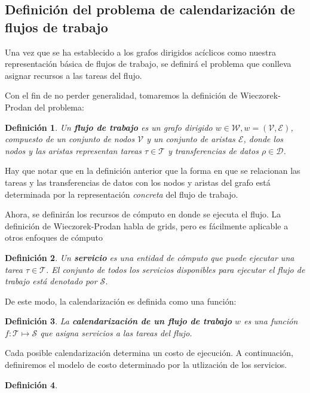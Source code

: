 \documentclass[letterpaper, 12pt]{report}
\newtheorem{defn}{Definición}
\begin{document}
\subsection{Definición del problema de calendarización de flujos de trabajo}
Una vez que se ha establecido a los grafos dirigidos acíclicos como nuestra representación básica de flujos de trabajo, se definirá el problema que conlleva asignar recursos a las tareas del flujo.

Con el fin de no perder generalidad, tomaremos la definición de Wieczorek-Prodan \cite{wieczorek2008taxonomies} del problema:

\begin{defn}
Un \textbf{flujo de trabajo} es un grafo dirigido $w \in \mathcal{W}, w = (\mathcal{V},\mathcal{E})$, compuesto de un conjunto de nodos $\mathcal{V}$ y un conjunto de aristas $\mathcal{E}$, donde los nodos y las aristas representan tareas $ \tau \in \mathcal{T}$ y transferencias de datos $ \rho \in \mathcal{D}$.
\end{defn}

Hay que notar que en la definición anterior que la forma en que se relacionan las tareas y las transferencias de datos con los nodos y aristas del grafo está determinada por la representación \emph{concreta} del flujo de trabajo.

Ahora, se definirán los recursos de cómputo en donde se ejecuta el flujo. La definición de Wieczorek-Prodan habla de grids, pero es fácilmente aplicable a otros enfoques de cómputo

\begin{defn}
Un \textbf{servicio} es una entidad de cómputo que puede ejecutar una tarea $\tau \in \mathcal{T}$. El conjunto de todos los servicios disponibles para ejecutar el flujo de trabajo está denotado por $\mathcal{S}$.
\end{defn}

De este modo, la calendarización es definida como una función:

\begin{defn}
La \textbf{calendarización de un flujo de trabajo} $w$ es una función $ f: \mathcal{T} \mapsto \mathcal{S}$ que asigna servicios a las tareas del flujo.
\end{defn}

Cada posible calendarización determina un costo de ejecución. A continuación, definiremos el modelo de costo determinado por la utlización de los servicios.

\begin{defn}

\end{defn}
\end{document}
